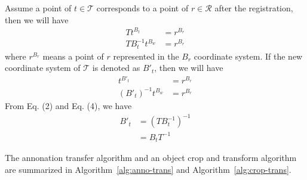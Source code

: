 \documentclass[letterpaper, 10 pt, conference]{ieeeconf}  %
\begin{document}
Assume a point of $t \in \mathcal{T}$ corresponds to a point of $r \in \mathcal{R}$ after the registration, then we will have
\begin{align}
T t^{B_t} &= r^{B_r}\\
T B_t^{-1}t^{B_w} &= r^{B_r} \label{eq:eq1}
\end{align}
where $r^{B_r}$ means a point of $r$ represented in the $B_r$ coordinate system. If the new coordinate system of $\mathcal{T}$ is denoted as $B'_t$, then we will have
\begin{align} 
t^{B'_t} &= r^{B_r}\\
(B'_t)^{-1}t^{B_w} &= r^{B_r} \label{eq:eq2}
\end{align}
From Eq. (2) and Eq. (4), we have
\begin{align}
{B'_t} & = (T B_t^{-1})^{-1}\\
& = B_t T^{-1} \label{eq:eq5}
\end{align}

The annonation transfer algorithm and an object crop and transform algorithm are summarized in Algorithm~\ref{alg:anno-trans} and Algorithm~\ref{alg:crop-trans}.
\end{document}

